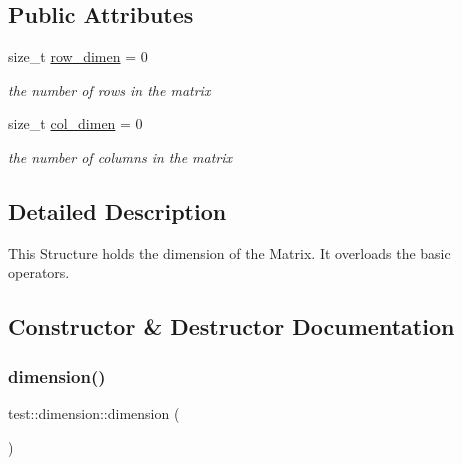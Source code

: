 \subsection*{Public Attributes}
\begin{DoxyCompactItemize}
\item 
size\+\_\+t \mbox{\hyperlink{structtest_1_1dimension_ad7dc1556e02d9dfadc5921ce76933ba9}{row\+\_\+dimen}} = 0
\begin{DoxyCompactList}\small\item\em the number of rows in the matrix \end{DoxyCompactList}\item 
size\+\_\+t \mbox{\hyperlink{structtest_1_1dimension_afdf8e5f0709b3e8cfdbb77f9896b03cf}{col\+\_\+dimen}} = 0
\begin{DoxyCompactList}\small\item\em the number of columns in the matrix \end{DoxyCompactList}\end{DoxyCompactItemize}


\subsection{Detailed Description}
This Structure holds the dimension of the Matrix. It overloads the basic operators. 



\subsection{Constructor \& Destructor Documentation}
\mbox{\label{structtest_1_1dimension_a07e66152eac33abc19208e3301c17438}} 
\subsubsection{\texorpdfstring{dimension()}{dimension()}\hspace{0.1cm}{\footnotesize\ttfamily [1/2]}}
{\footnotesize\ttfamily test\+::dimension\+::dimension (\begin{DoxyParamCaption}{ }\end{DoxyParamCaption})\hspace{0.3cm}{\ttfamily [default]}}



